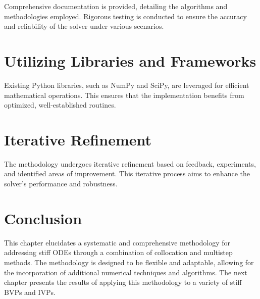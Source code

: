 Comprehensive documentation is provided, detailing the algorithms and methodologies employed. Rigorous testing is conducted to ensure the accuracy and reliability of the solver under various scenarios.

\section{Utilizing Libraries and Frameworks}

Existing Python libraries, such as NumPy and SciPy, are leveraged for efficient mathematical operations. This ensures that the implementation benefits from optimized, well-established routines.

\section{Iterative Refinement}

The methodology undergoes iterative refinement based on feedback, experiments, and identified areas of improvement. This iterative process aims to enhance the solver's performance and robustness.


\begin{table}[htbp]
   \centering
   \caption{Comparison of Solvers}
   \label{tab:solver-comparison}
\end{table}
   

\section{Conclusion}

This chapter elucidates a systematic and comprehensive methodology for addressing stiff ODEs through a combination of collocation and multistep methods. The methodology is designed to be flexible and adaptable, allowing for the incorporation of additional numerical techniques and algorithms. The next chapter presents the results of applying this methodology to a variety of stiff BVPs and IVPs.

